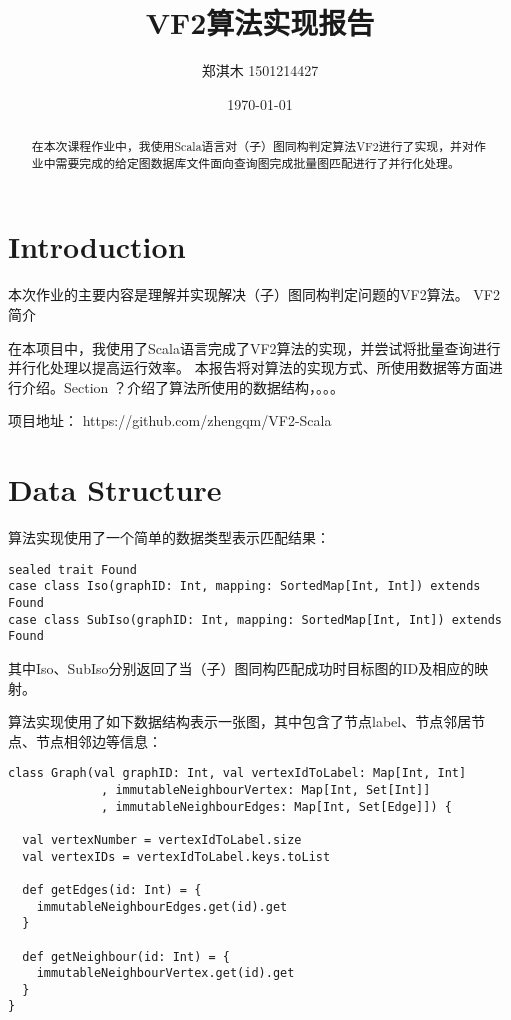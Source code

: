 \documentclass{article}
\title{VF2算法实现报告}
\author{郑淇木  1501214427}
\date{\today}
\begin{document}
\maketitle

\begin{abstract}
在本次课程作业中，我使用Scala语言对（子）图同构判定算法VF2进行了实现，并对作业中需要完成的给定图数据库文件面向查询图完成批量图匹配进行了并行化处理。

\end{abstract}


\section{Introduction}
本次作业的主要内容是理解并实现解决（子）图同构判定问题的VF2算法\cite{vf2}。
VF2简介

在本项目中，我使用了Scala语言完成了VF2算法的实现，并尝试将批量查询进行并行化处理以提高运行效率。
本报告将对算法的实现方式、所使用数据等方面进行介绍。Section ？介绍了算法所使用的数据结构，。。。

项目地址： https://github.com/zhengqm/VF2-Scala

\section{Data Structure}

算法实现使用了一个简单的数据类型表示匹配结果：

\begin{lstlisting}[style=mStyle]
sealed trait Found
case class Iso(graphID: Int, mapping: SortedMap[Int, Int]) extends Found
case class SubIso(graphID: Int, mapping: SortedMap[Int, Int]) extends Found
\end{lstlisting}

其中Iso、SubIso分别返回了当（子）图同构匹配成功时目标图的ID及相应的映射。

算法实现使用了如下数据结构表示一张图，其中包含了节点label、节点邻居节点、节点相邻边等信息：

\begin{lstlisting}[style=mStyle]
class Graph(val graphID: Int, val vertexIdToLabel: Map[Int, Int]
             , immutableNeighbourVertex: Map[Int, Set[Int]]
             , immutableNeighbourEdges: Map[Int, Set[Edge]]) {

  val vertexNumber = vertexIdToLabel.size
  val vertexIDs = vertexIdToLabel.keys.toList

  def getEdges(id: Int) = {
    immutableNeighbourEdges.get(id).get
  }

  def getNeighbour(id: Int) = {
    immutableNeighbourVertex.get(id).get
  }
}
\end{lstlisting}
\end{document}
